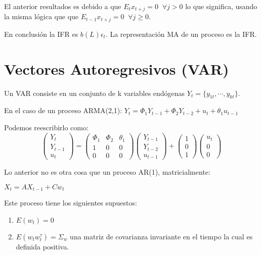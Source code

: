 \documentclass[
]{book}
\begin{document}
El anterior resultados es debido a que \(E_{t}x_{t+j}=0\;\;\forall j>0\) lo que significa, usando la misma lógica que que \(E_{t-1}x_{t+j}=0\;\;\forall j\geq 0\).

En conclusión la IFR es \(b(L)\epsilon_{t}\). La representación MA de un proceso es la IFR.

\hypertarget{vectores-autoregresivos-var}{%
\chapter{Vectores Autoregresivos (VAR)}\label{vectores-autoregresivos-var}}

Un VAR consiste en un conjunto de k variables endógenas \(Y_{t}=\{y_{1t},\cdots, y_{kt}\}\).

En el caso de un proceso ARMA(2,1):
\(Y_t = \Phi_1Y_{t-1} + \Phi_2Y_{t-2} + u_t + \theta_1u_{t-1}\)

Podemos reescribirlo como:
\begin{equation}
\left( \begin{array}{c}
Y_{t} \\
Y_{t-1} \\
u_{t} 
\end{array}
\right)=\left( \begin{array}{ccc}
\Phi_1 & \Phi_2 & \theta_1\\
1 & 0 & 0\\
0 & 0 & 0
\end{array}
\right) \left( \begin{array}{c}
Y_{t-1} \\
Y_{t-2} \\
u_{t-1} 
\end{array}
\right)+\left( \begin{array}{c}
1\\
0 \\
1
\end{array}
\right) \left( \begin{array}{c}
u_{t} \\
0 \\
0
\end{array}
\right) 
\nonumber
\end{equation}

Lo anterior no es otra cosa que un proceso AR(1), matricialmente:

\(X_t = AX_{t−1} + Cw_t\)

Este proceso tiene los siguientes supuestos:

\begin{enumerate}
\def\labelenumi{\arabic{enumi}.}
\item
  \(E(w_{t})=0\)
\item
  \(E(w_{t}w_{t}^{\tau})=\Sigma_{w}\) una matriz de covarianza invariante en el tiempo la cual es definida positiva.
\end{enumerate}
\end{document}
